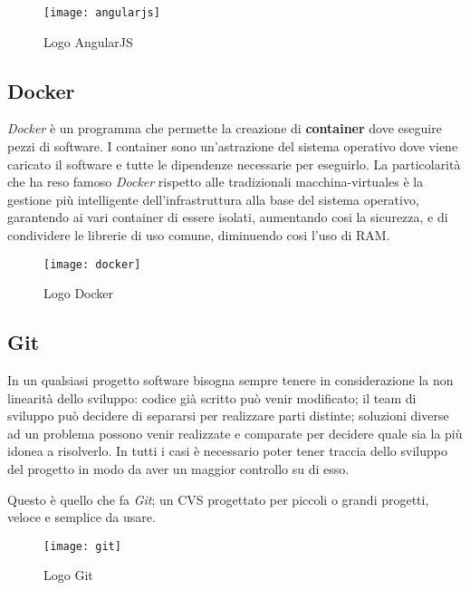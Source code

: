 \begin{figure}[H]
\begin{center}
\texttt{[image: angularjs]}
\caption{Logo AngularJS}
\label{fig:angularjs_logo}
\end{center}
\end{figure}

\subsection{Docker}
\textit{Docker} è un programma che permette la creazione di \textbf{container}
dove eseguire pezzi di software. I container sono un'astrazione del sistema
operativo dove viene caricato il software e tutte le dipendenze necessarie per
eseguirlo. La particolarità che ha reso famoso \textit{Docker} rispetto alle
tradizionali \glspl{macchina-virtuale} è la gestione più intelligente
dell'infrastruttura alla base del sistema operativo, garantendo ai vari
container di essere isolati, aumentando cosi la sicurezza, e di condividere le
librerie di uso comune, diminuendo cosi l'uso di \acrshort{RAM}.
\begin{figure}[H]
\begin{center}
\texttt{[image: docker]}
\caption{Logo Docker}
\label{fig:docker_logo}
\end{center}
\end{figure}

\subsection{Git}
In un qualsiasi progetto software bisogna sempre tenere in considerazione la non
linearità dello sviluppo: codice già scritto può venir modificato; il team di
sviluppo può decidere di separarsi per realizzare parti distinte; soluzioni
diverse ad un problema possono venir realizzate e comparate per decidere quale
sia la più idonea a risolverlo. In tutti i casi è necessario poter tener traccia
dello sviluppo del progetto in modo da aver un maggior controllo su di esso.

Questo è quello che fa \textit{Git}; un \gls{CVS} progettato per piccoli o
grandi progetti, veloce e semplice da usare.

\begin{figure}[H]
\begin{center}
\texttt{[image: git]}
\caption{Logo Git}
\label{fig:git_logo}
\end{center}
\end{figure}

